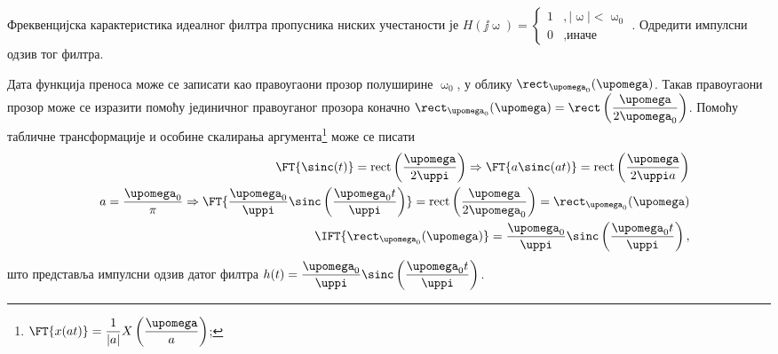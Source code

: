 \PID \label{z:lpf}
Фреквенцијска карактеристика идеалног филтра пропусника ниских учестаности је 
$H(\jj\upomega) = 
\begin{cases}
    1 &, |\upomega| < \upomega_0 \\
    0 &, \text{иначе}
\end{cases}.$ Одредити импулсни одзив тог филтра. 

\RESENJE 

Дата функција преноса може се записати као правоугаони прозор полуширине 
$\upomega_0$, у облику $\rect_{\upomega_0}(\upomega)$.
Такав правоугаони прозор може се изразити помоћу јединичног правоуганог прозора коначно
$\rect_{\upomega_0}(\upomega) = \rect \left( \dfrac{\upomega}{2\upomega_0} \right)$.
Помоћу табличне трансформације  и особине скалирања аргумента\footnote{
    $\FT{x(at)} = \dfrac{1}{|a|} X\left( \dfrac{\upomega}{a} \right)$;
} може се писати
\begin{eqnarray}
    && \FT{ \sinc(t) } = \mathrm{rect}\left(\frac{\upomega}{2\uppi}\right)
    \Rightarrow
    \FT{ a \sinc(at) } = \mathrm{rect}\left(\frac{\upomega}{2\uppi a}\right) \\ 
    && a = \dfrac{\upomega_0}{\pi} \Rightarrow
    \FT{ \dfrac{\upomega_0}{\uppi} \sinc \left( \dfrac{\upomega_0 t}{\uppi} \right) } = \mathrm{rect}\left(\frac{\upomega}{2 \upomega_0}\right) 
    =   \rect_{\upomega_0} (\upomega) \\ 
    && \IFT{ \rect_{\upomega_0} (\upomega)  } = \dfrac{\upomega_0}{\uppi} \sinc \left( \dfrac{\upomega_0 t}{\uppi} \right),
\end{eqnarray}
што представља импулсни одзив датог филтра $h(t) = \dfrac{\upomega_0}{\uppi} \sinc \left( \dfrac{\upomega_0 t}{\uppi} \right)$.
